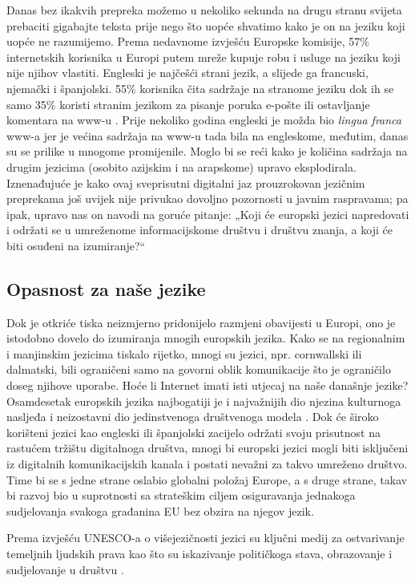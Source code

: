 \begin{multicols}{2}
Danas bez ikakvih prepreka možemo u nekoliko sekunda na drugu stranu svijeta prebaciti gigabajte teksta prije nego što uopće shvatimo kako je on na jeziku koji uopće ne razumijemo. Prema nedavnome izvješću Europske komisije, 57\% internetskih korisnika u Europi putem mreže kupuje robu i usluge na jeziku koji nije njihov vlastiti. Engleski je najčešći strani jezik, a slijede ga francuski, njemački i španjolski. 55\% korisnika čita sadržaje na stranome jeziku dok ih se samo 35\% koristi stranim jezikom za pisanje poruka e-pošte ili ostavljanje komentara na www-u \cite{str2}. Prije nekoliko godina engleski je možda bio \emph{lingua franca} www-a jer je većina sadržaja na www-u tada bila na engleskome, međutim, danas su se prilike u mnogome promijenile. Moglo bi se reći kako je količina sadržaja na drugim jezicima (osobito azijskim i na arapskome) upravo eksplodirala. Iznenađujuće je kako ovaj sveprisutni digitalni jaz prouzrokovan jezičnim preprekama još uvijek nije privukao dovoljno pozornosti u javnim raspravama; pa ipak, upravo nas on navodi na goruće pitanje: „Koji će europski jezici napredovati i održati se u umreženome informacijskome društvu i društvu znanja, a koji će biti osuđeni na izumiranje?“

\subsection{Opasnost za naše jezike}

Dok je otkriće tiska neizmjerno pridonijelo razmjeni obavijesti u Europi, ono je istodobno dovelo do izumiranja mnogih europskih jezika. Kako se na regionalnim i manjinskim jezicima tiskalo rijetko, mnogi su jezici, npr. cornwallski ili dalmatski, bili ograničeni samo na govorni oblik komunikacije što je ograničilo doseg njihove uporabe. Hoće li Internet imati isti utjecaj na naše današnje jezike? Osamdesetak europskih jezika najbogatiji je i najvažnijih dio njezina kulturnoga nasljeđa i neizostavni dio jedinstvenoga društvenoga modela \cite{str3}. Dok će široko korišteni jezici kao engleski ili španjolski zacijelo održati svoju prisutnost na rastućem tržištu digitalnoga društva, mnogi bi europski jezici mogli biti isključeni iz digitalnih komunikacijskih kanala i postati nevažni za takvo umreženo društvo. Time bi se s jedne strane oslabio globalni položaj Europe, a s druge strane, takav bi razvoj bio u suprotnosti sa strateškim ciljem osiguravanja jednakoga sudjelovanja svakoga građanina EU bez obzira na njegov jezik.

Prema izvješću UNESCO-a o višejezičnosti jezici su ključni medij za ostvarivanje temeljnih ljudskih prava kao što su iskazivanje političkoga stava, obrazovanje i sudjelovanje u društvu \cite{str4}. 


\end{multicols}
